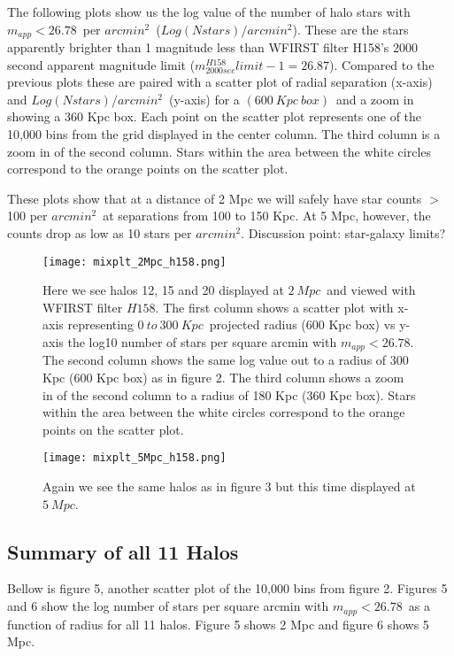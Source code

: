 \documentclass[11pt,a4paper,fleqn,notitlepage,oneside]{article}
\begin{document}
		The following plots show us the log value of the number of halo stars with $m_{app}<26.78$\ per $arcmin^{2}$\ ($Log(Nstars)/arcmin^{2}$).
		These are the stars apparently brighter than 1 magnitude less than WFIRST filter H158's 2000 second apparent magnitude limit ($m^{H158}_{2000sec}limit-1=26.87$).
		Compared to the previous plots these are paired with a scatter plot of radial separation (x-axis) and $Log(Nstars)/arcmin^{2}$\ (y-axis) for a $(600\ Kpc\ box)$\ and a zoom in showing a 360 Kpc box.
		Each point on the scatter plot represents one of the 10,000 bins from the grid displayed in the center column.
		The third column is a zoom in of the second column.
		Stars within the area between the white circles correspond to the orange points on the scatter plot.

		These plots show that at a distance of 2 Mpc we will safely have star counts $>$ 100 per $arcmin^{2}$\ at separations from 100 to 150 Kpc.
		At 5 Mpc, however, the counts drop as low as 10 stars per $arcmin^{2}$.
		Discussion point: star-galaxy limits? 
		\begin{figure}[H]\centering
			\texttt{[image: mixplt\_2Mpc\_h158.png]}
		\caption{
			Here we see halos 12, 15 and 20 displayed at $2\ Mpc$\ and viewed with WFIRST filter $H158$.
			The first column shows a scatter plot with x-axis representing $0\ to\ 300\ Kpc$\ projected radius (600 Kpc box) vs y-axis the log10 number of stars per square arcmin with $m_{app}<26.78$.
			The second column shows the same log value out to a radius of 300 Kpc (600 Kpc box) as in figure 2.
			The third column shows a zoom in of the second column to a radius of 180 Kpc (360 Kpc box).
			Stars within the area between the white circles correspond to the orange points on the scatter plot.
		}
		\label{fig:mean_starclass_at_r_2Mpc}
		\end{figure}

		\begin{figure}[H]\centering
			\texttt{[image: mixplt\_5Mpc\_h158.png]}
		\caption{
			Again we see the same halos as in figure 3 but this time displayed at $5\ Mpc$.
		}
		\label{fig:mean_starclass_at_r_5Mpc}
		\end{figure}

	\subsection{Summary of all 11 Halos} %
		\label{sub:summary_of_all_11_halos}
		Bellow is figure 5, another scatter plot of the 10,000 bins from figure 2.
		Figures 5 and 6 show the log number of stars per square arcmin with $m_{app}<26.78$\ as a function of radius for all 11 halos.
		Figure 5 shows 2 Mpc and figure 6 shows 5 Mpc.
\end{document}
